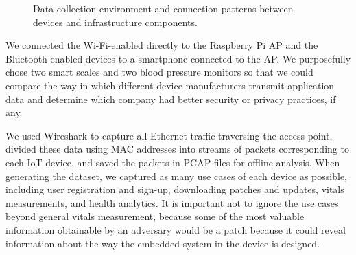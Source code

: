 \begin{figure}
  \centering
  \caption{Data collection environment and connection patterns between devices and infrastructure components.}
  \label{fig:data-collection}
\end{figure}

We connected the Wi-Fi-enabled directly to the Raspberry Pi AP and the Bluetooth-enabled devices to a smartphone connected to the AP.
We purposefully chose two smart scales and two blood pressure monitors so that we could compare the way in which different device manufacturers transmit application data and determine which company had better security or privacy practices, if any. 

We used Wireshark to capture all Ethernet traffic traversing the access point, divided these data using MAC addresses into streams of packets corresponding to each IoT device, and saved the packets in PCAP files for offline analysis. 
 When generating the dataset, we captured as many use cases of each device as possible, including user registration and sign-up, downloading patches and updates, vitals measurements, and health analytics. It is important not to ignore the use cases beyond general vitals measurement, because some of the most valuable information obtainable by an adversary would be a patch because it could reveal information about the way the embedded system in the device is designed. 

